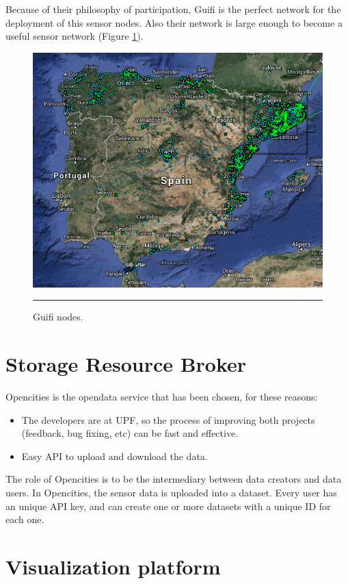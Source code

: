 \documentclass[12pt, a4paper,twoside]{tesi_upf}
\begin{document}
    Because of their philosophy of participation, Guifi is the perfect network for the deployment of this sensor nodes. Also their network is large enough to become a useful sensor network (Figure \ref{fig:Guifimap}).
    \begin{figure}[htbp]
      \centering
          \includegraphics[scale=0.5]{./Figures/Guifimap.png}
          \rule{25em}{0.5pt}
      \caption[Guifi nodes]{Guifi nodes.}
      \label{fig:Guifimap}
    \end{figure}
    
  \section{Storage Resource Broker}  
    Opencities \cite{opencities} is the opendata service that has been chosen, for these reasons:
    \begin{itemize}
      \item The developers are at UPF, so the process of improving both projects (feedback, bug fixing, etc) can be fast and effective.
      \item Easy API to upload and download the data.
    \end{itemize}
    
    The role of Opencities is to be the intermediary between data creators and data users.
    In Opencities, the sensor data is uploaded into a dataset. Every user has an unique API key, and can create one or more datasets with a unique ID for each one. 
    
  \section{Visualization platform}
    
\end{document}
